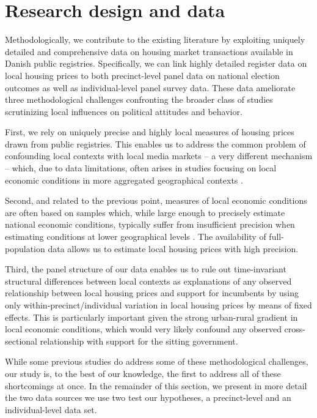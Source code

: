 \documentclass[12pt,a4paper]{article}
\begin{document}
	\section{Research design and data}\label{resdesign}
	
	Methodologically, we contribute to the existing literature by exploiting uniquely detailed and comprehensive data on housing market transactions available in Danish public registries. Specifically, we can link highly detailed register data on local housing prices to both precinct-level panel data on national election outcomes as well as individual-level panel survey data. These data ameliorate three methodological challenges confronting the broader class of studies scrutinizing local influences on political attitudes and behavior.
	
	First, we rely on uniquely precise and highly local measures of housing prices drawn from public registries. This enables us to address the common problem of confounding local contexts with local media markets -- a very different mechanism -- which, due to data limitations, often arises in studies focusing on local economic conditions in more aggregated geographical contexts \citep[][]{bisgaard2016reconsidering}.  
	
	Second, and related to the previous point, measures of local economic conditions are often based on samples which, while large enough to precisely estimate national economic conditions, typically suffer from insufficient precision when estimating conditions at lower geographical levels \citep[][]{healy2017presidential}. The availability of full-population data allows us to estimate local housing prices with high precision.
	
	Third, the panel structure of our data enables us to rule out time-invariant structural differences between local contexts as explanations of any observed relationship between local housing prices and support for incumbents by using only within-precinct/individual variation in local housing prices by means of fixed effects. This is particularly important given the strong urban-rural gradient in local economic conditions, which would very likely confound any observed cross-sectional relationship with support for the sitting government.
	
	While some previous studies do address some of these methodological challenges, our study is, to the best of our knowledge, the first to address all of these shortcomings at once. In the remainder of this section, we present in more detail the two data sources we use two test our hypotheses, a precinct-level and an individual-level data set.
	
\end{document}
